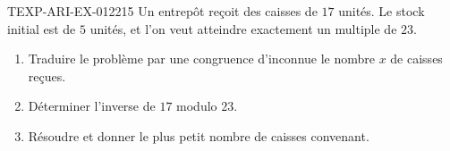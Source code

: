 \begin{exercice}{TEXP-ARI-EX-012}{2}{15}
Un entrepôt reçoit des caisses de $17$ unités. Le stock initial est de
$5$ unités, et l'on veut atteindre exactement un multiple de $23$.
\begin{enumerate}
  \item Traduire le problème par une congruence d'inconnue le nombre $x$ de
        caisses reçues.
  \item Déterminer l'inverse de $17$ modulo $23$.
  \item Résoudre et donner le plus petit nombre de caisses convenant.
\end{enumerate}
\end{exercice}
